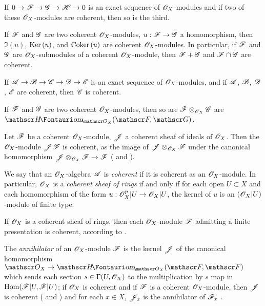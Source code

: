 \begin{env}[5.3.3]
\label{0.5.3.3}
If $0\to\sh{F}\to\sh{G}\to\sh{H}\to 0$ is an exact sequence of $\mathscr{O}_X$-modules and if two of these $\mathscr{O}_X$-modules are coherent, then so is the third.
\end{env}

\begin{env}[5.3.4]
\label{0.5.3.4}
If $\mathscr{F}$ and $\mathscr{G}$ are two coherent $\mathscr{O}_X$-modules, $u:\sh{F}\to\sh{G}$ a homomorphism, then $\Im(u)$, ${\mathop{\mathrm{Ker}}\nolimits}\,(u)$, and ${\mathop{\mathrm{Coker}}\nolimits}\,(u)$ are coherent $\mathscr{O}_X$-modules.
In particular, if $\mathscr{F}$ and $\mathscr{G}$ are $\mathscr{O}_X$-submodules of a coherent $\mathscr{O}_X$-module, then $\mathscr{F}+\mathscr{G}$ and $\mathscr{F}\cap\mathscr{G}$ are coherent.

If $\sh{A}\to\sh{B}\to\sh{C}\to\sh{D}\to\sh{E}$ is an exact sequence of $\mathscr{O}_X$-modules, and if $\mathscr{A}$, $\mathscr{B}$, $\mathscr{D}$, $\mathscr{E}$ are coherent, then $\mathscr{C}$ is coherent.
\end{env}

\begin{env}[5.3.5]
\label{0.5.3.5}
If $\mathscr{F}$ and $\mathscr{G}$ are two coherent $\mathscr{O}_X$-modules, then so are $\mathscr{F}\otimes_{\mathscr{O}_X}\mathscr{G}$ are $\shHom_{\OO_X}(\sh{F},\sh{G})$.
\end{env}

\begin{env}[5.3.6]
\label{0.5.3.6}
Let $\mathscr{F}$ be a coherent $\mathscr{O}_X$-module, $\mathscr{J}$ a coherent sheaf of ideals of $\mathscr{O}_X$.
Then the $\mathscr{O}_X$-module $\mathscr{J}\mathscr{F}$ is coherent, as the image of $\mathscr{J}\otimes_{\mathscr{O}_X}\mathscr{F}$ under the canonical homomorphism $\sh{J}\otimes_{\OO_X}\sh{F}\to\sh{F}$ ( and ).
\end{env}

\begin{env}[5.3.7]
\label{0.5.3.7}
We say that an $\mathscr{O}_X$-algebra $\mathscr{A}$ is \emph{coherent} if it is coherent as an $\mathscr{O}_X$-module.
In particular, $\mathscr{O}_X$ is a \emph{coherent sheaf of rings} if and only if for each open $U\subset X$ and each homomorphism of the form $u:\OO_X^p|U\to\OO_X|U$, the kernel of $u$ is an $(\mathscr{O}_X|U)$-module of finite type.

If $\mathscr{O}_X$ is a coherent sheaf of rings, then each $\mathscr{O}_X$-module $\mathscr{F}$ admitting a finite presentation  is coherent, according to .

The \emph{annihilator} of an $\mathscr{O}_X$-module $\mathscr{F}$ is the kernel $\mathscr{J}$ of the canonical homomorphism $\OO_X\to\shHom_{\OO_X}(\sh{F},\sh{F})$ which sends each section $s\in\Gamma(U,\mathscr{O}_X)$ to the multiplication by $s$ map in ${\mathop{\mathrm{Hom}}\nolimits}(\mathscr{F}|U,\mathscr{F}|U)$;
if $\mathscr{O}_X$ is coherent and if $\mathscr{F}$ is a coherent $\mathscr{O}_X$-module, then $\mathscr{J}$ is coherent ( and ) and for each $x\in X$, $\mathscr{J}_x$ is the annihilator of $\mathscr{F}_x$ .
\end{env}

